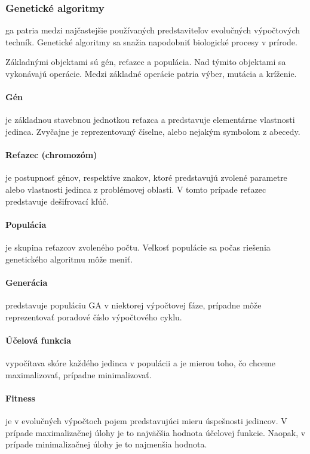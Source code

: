 \subsubsection{Genetické algoritmy}
\acrfull{ga} patria medzi najčastejšie používaných predstaviteľov evolučných výpočtových techník.
Genetické algoritmy sa snažia napodobniť biologické procesy v prírode.

Základnými objektami sú gén, reťazec a populácia. Nad týmito objektami sa vykonávajú operácie.
Medzi základné operácie patria výber, mutácia a kríženie.

\paragraph{Gén} je základnou stavebnou jednotkou reťazca a predstavuje elementárne vlastnosti jedinca.
Zvyčajne je reprezentovaný číselne, alebo nejakým symbolom z abecedy.

\paragraph{Reťazec (chromozóm)} je postupnosť génov, respektíve znakov, ktoré predstavujú zvolené parametre alebo vlastnosti jedinca
z problémovej oblasti. V tomto prípade reťazec predstavuje dešifrovací kľúč. 

\paragraph{Populácia} je skupina reťazcov zvoleného počtu. Veľkosť populácie sa počas riešenia genetického algoritmu môže meniť.

\paragraph{Generácia} predstavuje populáciu GA v niektorej výpočtovej fáze, prípadne môže reprezentovať poradové číslo výpočtového cyklu.

\paragraph{Účelová funkcia} vypočítava skóre každého jedinca v populácii a je mierou toho, čo chceme maximalizovať, prípadne minimalizovať.

\paragraph{Fitness} je v evolučných výpočtoch pojem predstavujúci mieru úspešnosti jedincov.
V prípade maximalizačnej úlohy je to najväčšia hodnota účelovej funkcie. Naopak, v prípade minimalizačnej úlohy je to najmenšia hodnota.

